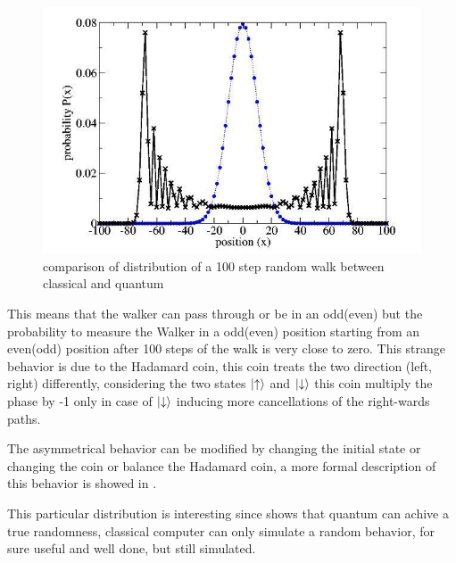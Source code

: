 \begin{figure}[h!]
    \includegraphics[scale=0.5]{img/dist.jpg}
    \caption{comparison of distribution of a 100 step random walk between classical and quantum}
    \centering
\end{figure}

This means that the walker can pass through or be in an odd(even) but the probability to measure the Walker in a odd(even) position starting 
from an even(odd) position after 100 steps of the walk is very close to zero.  
This strange behavior is due to the Hadamard coin, this coin treats the two direction (left, right) differently, 
considering the two states $\ket{\uparrow }$ and $\ket{\downarrow }$ this coin multiply the phase 
by -1 only in case of $\ket{\downarrow }$ inducing more cancellations of the right-wards paths. \cite{Kempe_2003}

The asymmetrical behavior can be modified by changing the initial state or 
changing the coin or balance the Hadamard coin, a more formal description of this behavior is showed in \cite{6812670}.

This particular distribution is interesting since shows that quantum can achive a true randomness, classical computer
can only simulate a random behavior, for sure useful and well done, but still simulated. 